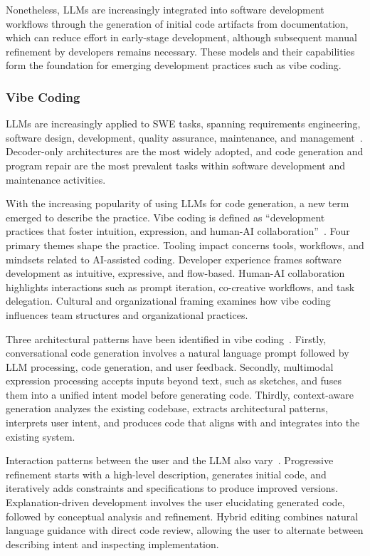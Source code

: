 \documentclass[
english,                 %
bibtex,                  %
includeExtraAbstracts, %
]{kththesis}
\numberwithin{listing}{chapter}
\begin{document}
Nonetheless, \glspl{LLM} are increasingly integrated into software development workflows through the generation of initial code artifacts from documentation, which can reduce effort in early-stage development, although subsequent manual refinement by developers remains necessary. These models and their capabilities form the foundation for emerging development practices such as vibe coding.

\subsubsection{Vibe Coding}

\Glspl{LLM} are increasingly applied to \gls{SWE} tasks, spanning requirements engineering, software design, development, quality assurance, maintenance, and management~\cite{hou_large_2024}. Decoder-only architectures are the most widely adopted, and code generation and program repair are the most prevalent tasks within software development and maintenance activities.

With the increasing popularity of using \glspl{LLM} for code generation, a new term emerged to describe the practice. Vibe coding is defined as ``development practices that foster intuition, expression, and human-AI collaboration''~\cite{beaulieu_vibe_2025}. Four primary themes shape the practice. Tooling impact concerns tools, workflows, and mindsets related to AI-assisted coding. Developer experience frames software development as intuitive, expressive, and flow-based. Human-AI collaboration highlights interactions such as prompt iteration, co-creative workflows, and task delegation. Cultural and organizational framing examines how vibe coding influences team structures and organizational practices.

Three architectural patterns have been identified in vibe coding~\cite{akhilesh_gadde_democratizing_2025}. Firstly, conversational code generation involves a natural language prompt followed by \gls{LLM} processing, code generation, and user feedback. Secondly, multimodal expression processing accepts inputs beyond text, such as sketches, and fuses them into a unified intent model before generating code. Thirdly, context-aware generation analyzes the existing codebase, extracts architectural patterns, interprets user intent, and produces code that aligns with and integrates into the existing system.

Interaction patterns between the user and the \gls{LLM} also vary~\cite{akhilesh_gadde_democratizing_2025}. Progressive refinement starts with a high-level description, generates initial code, and iteratively adds constraints and specifications to produce improved versions. Explanation-driven development involves the user elucidating generated code, followed by conceptual analysis and refinement. Hybrid editing combines natural language guidance with direct code review, allowing the user to alternate between describing intent and inspecting implementation.
\end{document}
